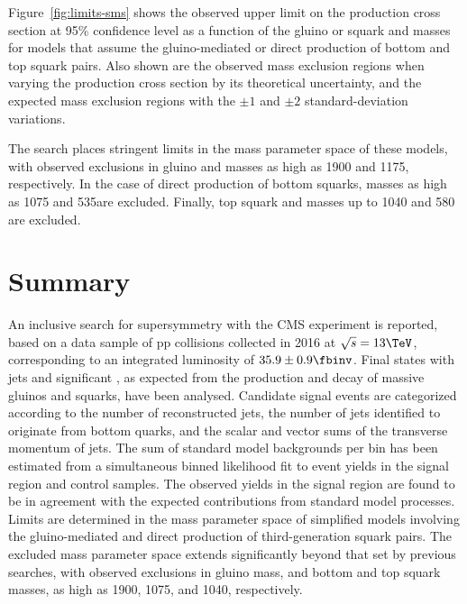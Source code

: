 Figure~\ref{fig:limits-sms} shows the observed upper limit on the
production cross section at 95\% confidence level as a function of the
gluino or squark and \chiz masses for models that assume the
gluino-mediated or direct production of bottom and top squark
pairs. Also shown are the observed mass exclusion regions when varying
the production cross section by its theoretical uncertainty, and the
expected mass exclusion regions with the ${\pm}1$ and ${\pm}2$
standard-deviation variations.

The search places stringent limits in the mass parameter space of
these models, with observed exclusions in gluino and \chiz masses as
high as 1900 and 1175\GeV, respectively. In the case of direct
production of bottom squarks, masses as high as 1075 and 535\GeV are
excluded. Finally, top squark and \chiz masses up to 1040 and 580\GeV
are excluded. 


\clearpage
\section{Summary}
\label{sec:summary}

An inclusive search for supersymmetry with the CMS experiment is
reported, based on a data sample of pp collisions collected in 2016 at
$\sqrt{s} = 13\TeV$, corresponding to an integrated luminosity of
$35.9 \pm 0.9 \fbinv$. Final states with jets and significant
\ptvecmiss, as expected from the production and decay of massive
gluinos and squarks, have been analysed. Candidate signal events are
categorized according to the number of reconstructed jets, the number
of jets identified to originate from bottom quarks, and the scalar and
vector sums of the transverse momentum of jets. The sum of standard
model backgrounds per bin has been estimated from a simultaneous
binned likelihood fit to event yields in the signal region and control
samples. The observed yields in the signal region are found to be in
agreement with the expected contributions from standard model
processes. Limits are determined in the mass parameter space of
simplified models involving the gluino-mediated and direct production
of third-generation squark pairs. The excluded mass parameter space
extends significantly beyond that set by previous searches, with
observed exclusions in gluino mass, and bottom and top squark masses,
as high as 1900, 1075, and 1040\GeV, respectively.

